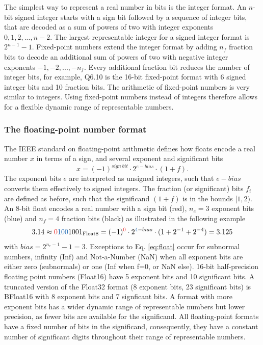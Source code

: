 \documentclass[draft]{agujournal2019}
\newcommand{\op}{\operatorname}
\begin{document}
The simplest way to represent a real number in bits is the integer format. An $n$-bit signed integer starts with a sign bit followed by a sequence of integer bits, that are decoded as a sum of powers of two with integer exponents $0,1,2,...,n-2$. The largest representable integer for a signed integer format is $2^{n-1}-1$. Fixed-point numbers extend the integer format by adding $n_f$ fraction bits to decode an additional sum of powers of two with negative integer exponents $-1,-2,...,-n_f$. Every additional fraction bit reduces the number of integer bits, for example, Q6.10 is the 16-bit fixed-point format with 6 signed integer bits and 10 fraction bits. The arithmetic of fixed-point numbers is very similar to integers. Using fixed-point numbers instead of integers therefore allows for a flexible dynamic range of representable numbers.

\subsubsection{The floating-point number format}
\label{sec:floats}

The IEEE standard on floating-point arithmetic defines how floats encode a real number $x$ in terms of a sign, and several exponent and significant bits
\begin{equation}
x = (-1)^{sign~bit} \cdot 2^{e-bias} \cdot (1+f).
\label{eq:float}
\end{equation}
The exponent bits $e$ are interpreted as unsigned integers, such that $e-bias$ converts them effectively to signed integers. The fraction (or significant) bits $f_i$ are defined as before, such that the significand $(1+f)$ is in the bounds $[1,2)$. An 8-bit float encodes a real number with a sign bit (red), $n_e = 3$ exponent bits (blue) and $n_f=4$ fraction bits (black) as illustrated in the following example
\begin{equation}
3.14 \approx {\color{psign}0}{\color{pexpo}100}1001_{\op{Float8}} = (-1)^{\color{psign}0} \cdot 2^{{\color{pexpo}4}-bias} \cdot (1+2^{-1}+2^{-4}) = 3.125
\label{eq:posit_pos}
\end{equation}
with $bias=2^{n_e-1} - 1 = 3$. Exceptions to Eq. \ref{eq:float} occur for subnormal numbers, infinity (Inf) and Not-a-Number (NaN) when all exponent bits are either zero (subnormals) or one (Inf when f=0, or NaN else). 16-bit half-precision floating point numbers (Float16) have 5 exponent bits and 10 significant bits. A truncated version of the Float32 format (8 exponent bits, 23 significant bits) is BFloat16 with 8 exponent bits and 7 signficant bits. A format with more exponent bits has a wider dynamic range of representable numbers but lower precision, as fewer bits are available for the significand. All floating-point formats have a fixed number of bits in the significand, consequently, they have a constant number of significant digits throughout their range of representable numbers.
\end{document}
